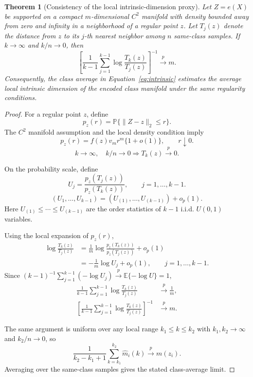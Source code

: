 \documentclass{article}
\newtheorem{theorem}{Theorem}
\begin{document}
\begin{theorem}[Consistency of the local intrinsic-dimension proxy]
	Let $Z=e(X)$ be supported on a compact $m$-dimensional $C^2$ manifold with density bounded away from zero and infinity in a neighborhood of a regular point $z$. Let $T_j(z)$ denote the distance from $z$ to its $j$-th nearest neighbor among $n$ same-class samples. If $k\rightarrow\infty$ and $k/n\rightarrow 0$, then
	\[
	\left[\frac{1}{k-1}\sum_{j=1}^{k-1}\log\frac{T_k(z)}{T_j(z)}\right]^{-1}
	\stackrel{p}{\longrightarrow} m.
	\]
	Consequently, the class average in Equation~\ref{eq:intrinsic} estimates the average local intrinsic dimension of the encoded class manifold under the same regularity conditions.
\end{theorem}

\begin{proof}
	For a regular point $z$, define
	\[
	p_z(r)=\mathbb{P}\{\lVert Z-z\rVert_2\le r\}.
	\]
	The $C^2$ manifold assumption and the local density condition imply
	\[
	p_z(r)=f(z)v_m r^m\{1+o(1)\},
	\qquad
	r\downarrow0.
	\]
	\[
	k\rightarrow\infty,\quad k/n\rightarrow0
	\Longrightarrow
	T_k(z)\stackrel{p}{\longrightarrow}0.
	\]

	On the probability scale, define
	\[
	U_j
	=
	\frac{p_z(T_j(z))}{p_z(T_k(z))},
	\qquad
	j=1,\ldots,k-1.
	\]
	\[
	(U_1,\ldots,U_{k-1})
	=
	(U_{(1)},\ldots,U_{(k-1)})+o_p(1).
	\]
	Here $U_{(1)}\le\cdots\le U_{(k-1)}$ are the order statistics of $k-1$ i.i.d. $U(0,1)$ variables.

	Using the local expansion of $p_z(r)$,
	\[
	\begin{aligned}
	\log\frac{T_k(z)}{T_j(z)}
	&=
	\frac{1}{m}
	\log\frac{p_z(T_k(z))}{p_z(T_j(z))}
	+o_p(1)\\
	&=
	-\frac{1}{m}\log U_j+o_p(1),
	\qquad j=1,\ldots,k-1 .
	\end{aligned}
	\]
	Since $(k-1)^{-1}\sum_{j=1}^{k-1}(-\log U_j)\stackrel{p}{\to}\mathbb{E}\{-\log U\}=1$,
	\[
	\begin{aligned}
	\frac{1}{k-1}\sum_{j=1}^{k-1}\log\frac{T_k(z)}{T_j(z)}
	&\stackrel{p}{\longrightarrow}
	\frac{1}{m},\\
	\left[
	\frac{1}{k-1}\sum_{j=1}^{k-1}\log\frac{T_k(z)}{T_j(z)}
	\right]^{-1}
	&\stackrel{p}{\longrightarrow}
	m .
	\end{aligned}
	\]

	The same argument is uniform over any local range $k_1\le k\le k_2$ with $k_1,k_2\to\infty$ and $k_2/n\to0$, so
	\[
	\frac{1}{k_2-k_1+1}
	\sum_{k=k_1}^{k_2}\widehat m_i(k)
	\stackrel{p}{\longrightarrow}
	m(z_i).
	\]
	Averaging over the same-class samples gives the stated class-average limit.
\end{proof}
\end{document}
